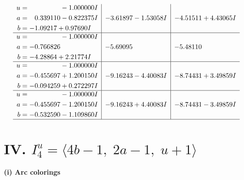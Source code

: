 \documentclass[1p]{elsarticle_modified}
\theoremstyle{definition}
\begin{document}
$$\begin{array}{c|c|c}
\begin{aligned}
u &= \phantom{-0.000000 } -1.000000 I \\
a &= \phantom{-}0.339110 - 0.822375 I \\
b &= -1.09217 + 0.97690 I\end{aligned}
 & -3.61897 - 1.53058 I & -4.51511 + 4.43065 I \\ \hline\begin{aligned}
u &= \phantom{-0.000000 } -1.000000 I \\
a &= -0.766826\phantom{ +0.000000I} \\
b &= -4.28864 + 2.21774 I\end{aligned}
 & -5.69095\phantom{ +0.000000I} & -5.48110\phantom{ +0.000000I} \\ \hline\begin{aligned}
u &= \phantom{-0.000000 } -1.000000 I \\
a &= -0.455697 + 1.200150 I \\
b &= -0.094259 + 0.272297 I\end{aligned}
 & -9.16243 - 4.40083 I & -8.74431 + 3.49859 I \\ \hline\begin{aligned}
u &= \phantom{-0.000000 } -1.000000 I \\
a &= -0.455697 - 1.200150 I \\
b &= -0.532590 - 1.109860 I\end{aligned}
 & -9.16243 + 4.40083 I & -8.74431 - 3.49859 I\\
 \hline 
 \end{array}$$\newpage\newpage\renewcommand{\arraystretch}{1}
\centering \section*{IV. $I^u_{4}= \langle 4 b-1,\;2 a-1,\;u+1 \rangle$}
\flushleft \textbf{(i) Arc colorings}\\
\end{document}
